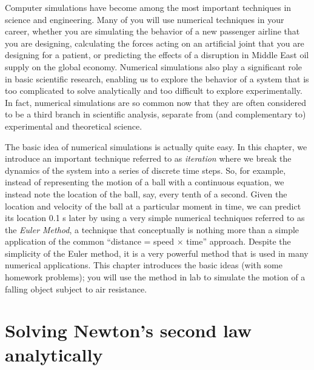 Computer simulations have become among the most important techniques
in science and engineering.  Many of you will use numerical techniques
in your career, whether you are simulating the behavior of a new
passenger airline that you are designing, calculating the forces acting
on an artificial joint that you are designing for a patient, or predicting
the effects of a disruption in Middle East oil supply on the global
economy.  Numerical simulations also play a significant role in basic
scientific research, enabling us to explore the behavior of a system that
is too complicated to solve analytically and too difficult to
explore experimentally.  In fact, numerical simulations are so
common now that they are often considered to be a third branch in
scientific analysis, separate from (and complementary to) experimental
and theoretical science.

The basic idea of numerical simulations is actually quite easy.  
In this chapter, we introduce an important technique referred to as 
\emph{iteration} where we break the dynamics of the system into 
a series of discrete time steps.  So, for example, instead of 
representing the motion of a ball with a continuous equation, we
instead note the location of the ball, say, every tenth of a second.
Given the location and velocity of the ball at a particular moment
in time, we can predict its location 0.1 s later by using a very 
simple numerical techniques referred to as the
\emph{Euler Method}, a technique that conceptually is nothing more
than a simple application of the common ``distance = speed $\times$ time''
approach.  Despite the simplicity of the Euler method, it is a very
powerful method that is used in many numerical applications.  This chapter
introduces the basic ideas (with some homework problems); you will use
the method in lab to simulate the motion of a falling object subject
to air resistance.

\section{Solving Newton's second law analytically}

